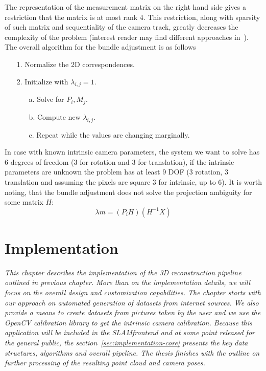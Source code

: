 The representation of the measurement matrix on the right hand side gives a restriction that the matrix is at most rank 4. This restriction, along with sparsity of such matrix and sequentiality of the camera track, greatly decreases the complexity of the problem (interest reader may find different approaches in~\cite{cvfx, book:multiple_view_geometry}). The overall algorithm for the bundle adjustment is as follows
\begin{itemize}
	\item[1.] Normalize the 2D correspondences.
	\item[2.] Initialize with $\lambda_{i,j} = 1$.
	\begin{itemize}
		\item[a.] Solve for $P_i, M_j$.
		\item[b.] Compute new $\lambda_{i,j}$.
		\item[c.] Repeat while the values are changing marginally.
	\end{itemize}
\end{itemize}

In case with known intrinsic camera parameters, the system we want to solve has 6 degrees of freedom (3 for rotation and 3 for translation), if the intrinsic parameters are unknown the problem has at least 9 DOF (3 rotation, 3 translation and assuming the pixels are square 3 for intrinsic, up to 6). It is worth noting, that the bundle adjustment does not solve the projection ambiguity for some matrix $H$:
\begin{equation}
	\lambda m = (P_i H) (H^{-1} X)
\end{equation}

\chapter{Implementation}
\label{chapter:implementation}
\textit{This chapter describes the implementation of the 3D reconstruction pipeline outlined in previous chapter. More than on the implementation details, we will focus on the overall design and customization capabilities. The chapter starts with our approach on automated generation of datasets from internet sources. We also provide a means to create datasets from pictures taken by the user and we use the OpenCV calibration library to get the intrinsic camera calibration. Because this application will be included in the SLAM\textunderscore frontend and at some point released for the general public, the section~\ref{sec:implementation-core} presents the key data structures, algorithms and overall pipeline. The thesis finishes with the outline on further processing of the resulting point cloud and camera poses.}

